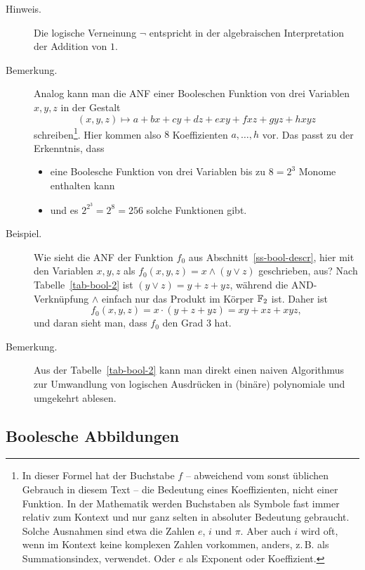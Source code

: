 \begin{refsegment}
\begin{description}
   \item[Hinweis.] Die logische Verneinung $\neg$ entspricht in der
      algebraischen Interpretation der Addition von $1$.
   \item[Bemerkung.] Analog kann man die ANF einer Booleschen Funktion von
      drei Variablen $x, y, z$ in der Gestalt
\[
     (x, y, z) \mapsto a + b x + c y + d z + e xy + f xz+ g yz + h xyz
\]
      schreiben\footnote{%
      In dieser Formel hat der Buchstabe $f$ -- abweichend vom
      sonst üblichen Gebrauch in diesem Text -- die Bedeutung eines
      Koeffizienten, nicht einer Funktion. In der Mathematik werden
      Buchstaben als Symbole fast immer relativ zum Kontext und nur ganz
      selten in absoluter Bedeutung gebraucht. Solche Ausnahmen sind
      etwa die Zahlen $e$, $i$ und $\pi$. Aber auch $i$ wird
      oft, wenn im Kontext keine komplexen Zahlen vorkommen,
      anders, z.\,B. als Summationsindex, verwendet. Oder $e$ als
      Exponent oder Koeffizient.
      }. Hier kommen also $8$ Koeffizienten $a, \ldots, h$
      vor. Das passt zu der Erkenntnis, dass
   \begin{itemize}
      \item eine Boolesche Funktion von drei Variablen bis zu $8 = 2^3$
         Monome enthalten kann
      \item und es $2^{2^3} = 2^8 = 256$ solche Funktionen gibt.
   \end{itemize}
   \item[Beispiel.] Wie sieht die ANF der Funktion $f_0$ aus
      Abschnitt~\ref{ss-bool-descr}, hier mit
      den Variablen $x, y, z$ als $f_0(x, y, z) = x \wedge (y \vee z)$
      geschrieben, aus? Nach Tabelle~\ref{tab-bool-2} ist
      $(y \vee z) = y + z + yz$, während die AND-Verknüpfung $\wedge$
      einfach nur das Produkt im Körper $\mathbb{F}_2$ ist. Daher ist
\[
     f_0(x, y, z) = x \cdot (y + z + yz) = xy + xz + xyz,
\]
      und daran sieht man, dass $f_0$ den Grad $3$ hat.
   \item[Bemerkung.] Aus der Tabelle~\ref{tab-bool-2} kann man direkt
      einen naiven Algorithmus zur Umwandlung von logischen Ausdrücken
      in (binäre) polynomiale und umgekehrt ablesen.
\end{description}

\subsection{Boolesche Abbildungen}\label{ss-bool-abb}


\end{refsegment}

